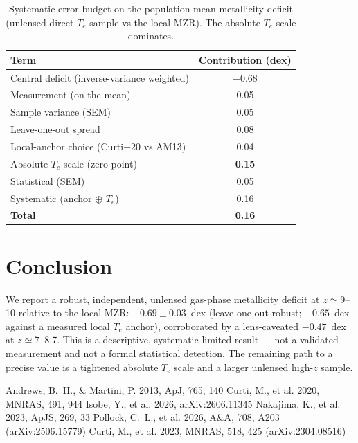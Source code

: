 \documentclass[twocolumn]{aastex631}
\begin{document}
\begin{table}[htb]
\centering
\caption{Systematic error budget on the population mean metallicity deficit (unlensed direct-$T_e$ sample
vs the local MZR). The absolute $T_e$ scale dominates.\label{tab:budget}}
\begin{tabular}{lc}
\hline
Term & Contribution (dex) \\
\hline
Central deficit (inverse-variance weighted) & $-0.68$ \\
\hline
Measurement (on the mean)      & 0.05 \\
Sample variance (SEM)          & 0.05 \\
Leave-one-out spread           & 0.08 \\
Local-anchor choice (Curti+20 vs AM13) & 0.04 \\
Absolute $T_e$ scale (zero-point) & \textbf{0.15} \\
\hline
Statistical (SEM)              & 0.05 \\
Systematic (anchor $\oplus$ $T_e$) & 0.16 \\
\textbf{Total}                 & \textbf{0.16} \\
\hline
\end{tabular}
\end{table}

\section{Conclusion}
We report a robust, independent, unlensed gas-phase metallicity deficit at $z\simeq9$--10 relative to the
local MZR: $-0.69\pm0.03$~dex (leave-one-out-robust; $-0.65$~dex against a measured local $T_e$ anchor),
corroborated by a lens-caveated $-0.47$~dex at $z\simeq7$--8.7. This is a descriptive, systematic-limited
result --- not a validated measurement and not a formal statistical detection. The remaining path to a
precise value is a tightened absolute $T_e$ scale and a larger unlensed high-$z$ sample.

\begin{thebibliography}{}
 Andrews, B.~H., \& Martini, P. 2013, ApJ, 765, 140
 Curti, M., et al. 2020, MNRAS, 491, 944
 Isobe, Y., et al. 2026, arXiv:2606.11345
 Nakajima, K., et al. 2023, ApJS, 269, 33
 Pollock, C.~L., et al. 2026, A\&A, 708, A203 (arXiv:2506.15779)
 Curti, M., et al. 2023, MNRAS, 518, 425 (arXiv:2304.08516)
\end{thebibliography}
\end{document}
